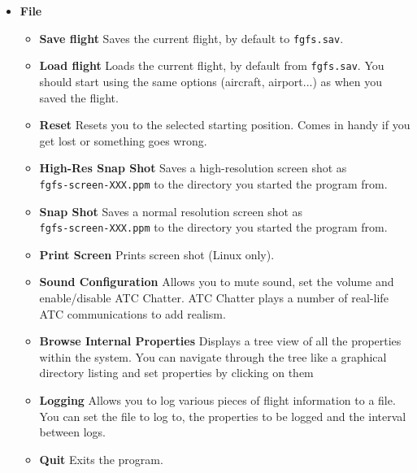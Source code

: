 \begin{itemize}
 \item \textbf{File}
 \begin{itemize}
  \item \textbf{Save flight} Saves the current flight, by
default to \texttt{fgfs.sav}.
 \item \textbf{Load flight} Loads the current flight, by
default from \texttt{fgfs.sav}. You should
start \FlightGear{} using the same options (aircraft, airport...) as when you
saved the flight.
 \item \textbf{Reset} Resets you to the selected starting
position.
 Comes in handy if you get lost or something goes wrong.
  \item \textbf{High-Res Snap Shot} Saves a high-resolution screen
shot as \\ \texttt{fgfs-screen-XXX.ppm} to
  the directory you started the program from.
  \item \textbf{Snap Shot} Saves a normal resolution screen
shot as \\ \texttt{fgfs-screen-XXX.ppm} to
  the directory you started the program from.
  \item \textbf{Print Screen} Prints screen shot (Linux only).
  \item \textbf{Sound Configuration} Allows you to mute sound, set the volume
and enable/disable ATC Chatter.
  ATC Chatter plays a number of real-life ATC communications to add realism.
  \item \textbf{Browse Internal Properties} Displays a tree view of all the
properties within the system.
  You can navigate through the tree like a graphical directory listing and set
properties by clicking on them
  \item \textbf{Logging} Allows you to log various pieces of flight information
to a file.
  You can set the file to log to, the properties to be logged and the interval
between logs.
  \item \textbf{Quit} Exits the program.
 \end{itemize}


\end{itemize}
